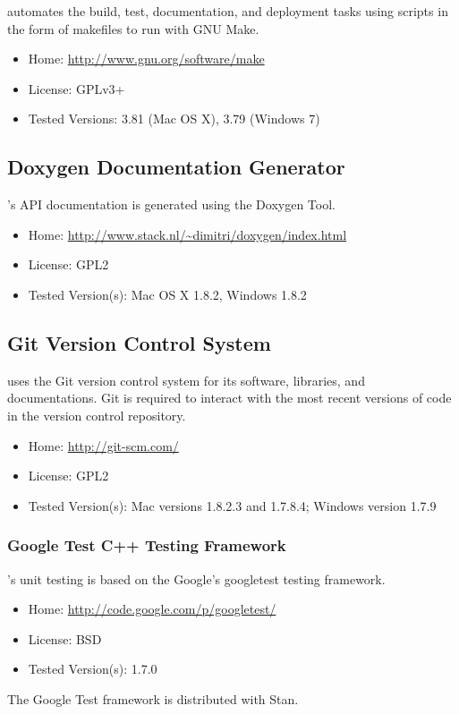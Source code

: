 \CmdStan automates the build, test, documentation, and deployment tasks
using scripts in the form of makefiles to run with GNU Make.
%
\begin{itemize}
\item Home: \url{http://www.gnu.org/software/make}
\item License: GPLv3+
\item Tested Versions: 3.81 (Mac OS X), 3.79 (Windows 7)
\end{itemize}
%


\subsection{Doxygen Documentation Generator}

\CmdStan's API documentation is generated using the Doxygen Tool.
%
\begin{itemize}
\item Home: \url{http://www.stack.nl/~dimitri/doxygen/index.html}
\item License: GPL2
\item Tested Version(s): Mac OS X 1.8.2, Windows 1.8.2
\end{itemize}


\subsection{Git Version Control System}

\CmdStan uses the Git version control system for its software, libraries,
and documentations.  Git is required to interact with the most recent
versions of code in the version control repository.
%
\begin{itemize}
\item Home: \url{http://git-scm.com/}
\item License: GPL2
\item Tested Version(s): Mac versions 1.8.2.3 and 1.7.8.4; Windows version 1.7.9
\end{itemize}


\subsubsection{Google Test C++ Testing Framework}

\CmdStan's unit testing is based on the Google's googletest \Cpp testing
framework.
%
\begin{itemize}
\item
Home: \url{http://code.google.com/p/googletest/}
\item
License: BSD
\item
Tested Version(s): 1.7.0
\end{itemize}
%
The Google Test framework is distributed with Stan.


